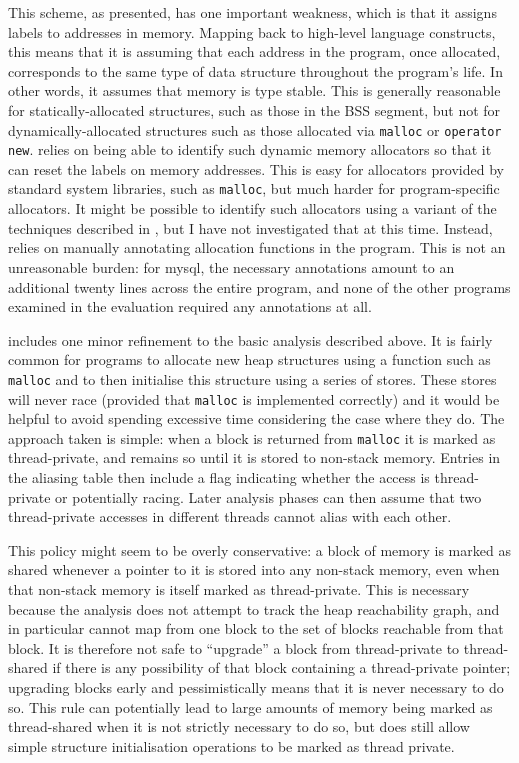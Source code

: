 This scheme, as presented, has one important weakness, which is that
it assigns labels to addresses in memory.  Mapping back to high-level
language constructs, this means that it is assuming that each address
in the program, once allocated, corresponds to the same type of data
structure throughout the program's life.  In other words, it assumes
that memory is type stable\needCite{}.  This is generally reasonable
for statically-allocated structures, such as those in the BSS
segment\needCite{}, but not for dynamically-allocated structures such
as those allocated via \texttt{malloc} or \texttt{operator new}.
{\Implementation} relies on being able to identify such dynamic memory
allocators so that it can reset the labels on memory addresses.  This
is easy for allocators provided by standard system libraries, such as
\texttt{malloc}, but much harder for program-specific allocators.  It
might be possible to identify such allocators using a variant of the
techniques described in , but I have not investigated that at this time.
Instead, {\implementation} relies on manually annotating allocation
functions in the program.  This is not an unreasonable burden: for
mysql, the necessary annotations amount to an additional twenty lines
across the entire program, and none of the other programs examined in
the evaluation required any annotations at all.

{\Implementation} includes one minor refinement to the basic analysis
described above.  It is fairly common for programs to allocate new
heap structures using a function such as \texttt{malloc} and to then
initialise this structure using a series of stores.  These stores will
never race (provided that \texttt{malloc} is implemented correctly)
and it would be helpful to avoid spending excessive time considering
the case where they do.  The approach taken is simple: when a block is
returned from \texttt{malloc} it is marked as thread-private, and
remains so until it is stored to non-stack memory.  Entries in the
aliasing table then include a flag indicating whether the access is
thread-private or potentially racing.  Later analysis phases can then
assume that two thread-private accesses in different threads cannot
alias with each other.

This policy might seem to be overly conservative: a block of memory is
marked as shared whenever a pointer to it is stored into any non-stack
memory, even when that non-stack memory is itself marked as
thread-private.  This is necessary because the analysis does not
attempt to track the heap reachability graph, and in particular cannot
map from one block to the set of blocks reachable from that block.  It
is therefore not safe to ``upgrade'' a block from thread-private to
thread-shared if there is any possibility of that block containing a
thread-private pointer; upgrading blocks early and pessimistically
means that it is never necessary to do so.  This rule can potentially
lead to large amounts of memory being marked as thread-shared when it
is not strictly necessary to do so, but does still allow simple
structure initialisation operations to be marked as thread private.

